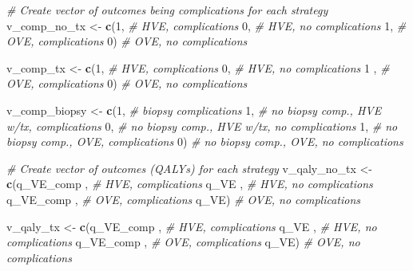 \documentclass[
]{article}
\newenvironment{Shaded}{\begin{snugshade}}{\end{snugshade}}
\newcommand{\CommentTok}[1]{\textcolor[rgb]{0.56,0.35,0.01}{\textit{#1}}}
\newcommand{\DecValTok}[1]{\textcolor[rgb]{0.00,0.00,0.81}{#1}}
\newcommand{\FunctionTok}[1]{\textcolor[rgb]{0.13,0.29,0.53}{\textbf{#1}}}
\newcommand{\NormalTok}[1]{#1}
\newcommand{\OtherTok}[1]{\textcolor[rgb]{0.56,0.35,0.01}{#1}}
\begin{document}
\begin{Shaded}
\begin{Highlighting}[]
\CommentTok{\# Create vector of outcomes being complications for each strategy }
\NormalTok{v\_comp\_no\_tx  }\OtherTok{\textless{}{-}} \FunctionTok{c}\NormalTok{(}\DecValTok{1}\NormalTok{,          }\CommentTok{\# HVE, complications}
                   \DecValTok{0}\NormalTok{,          }\CommentTok{\# HVE, no complications}
                   \DecValTok{1}\NormalTok{,          }\CommentTok{\# OVE, complications}
                   \DecValTok{0}\NormalTok{)          }\CommentTok{\# OVE, no complications}
  
\NormalTok{v\_comp\_tx     }\OtherTok{\textless{}{-}} \FunctionTok{c}\NormalTok{(}\DecValTok{1}\NormalTok{,          }\CommentTok{\# HVE, complications}
                   \DecValTok{0}\NormalTok{,          }\CommentTok{\# HVE, no complications}
                   \DecValTok{1}\NormalTok{ ,         }\CommentTok{\# OVE, complications}
                   \DecValTok{0}\NormalTok{)          }\CommentTok{\# OVE, no complications}
  
\NormalTok{v\_comp\_biopsy }\OtherTok{\textless{}{-}} \FunctionTok{c}\NormalTok{(}\DecValTok{1}\NormalTok{,          }\CommentTok{\# biopsy complications}
                   \DecValTok{1}\NormalTok{,          }\CommentTok{\# no biopsy comp., HVE w/tx, complications }
                   \DecValTok{0}\NormalTok{,          }\CommentTok{\# no biopsy comp., HVE w/tx, no complications}
                   \DecValTok{1}\NormalTok{,          }\CommentTok{\# no biopsy comp., OVE, complications}
                   \DecValTok{0}\NormalTok{)          }\CommentTok{\# no biopsy comp., OVE, no complications}
  

\CommentTok{\# Create vector of outcomes (QALYs) for each strategy }
\NormalTok{v\_qaly\_no\_tx  }\OtherTok{\textless{}{-}} \FunctionTok{c}\NormalTok{(q\_VE\_comp ,          }\CommentTok{\# HVE, complications}
\NormalTok{                   q\_VE      ,          }\CommentTok{\# HVE, no complications}
\NormalTok{                   q\_VE\_comp ,          }\CommentTok{\# OVE, complications}
\NormalTok{                   q\_VE)                }\CommentTok{\# OVE, no complications}
  
\NormalTok{v\_qaly\_tx     }\OtherTok{\textless{}{-}} \FunctionTok{c}\NormalTok{(q\_VE\_comp ,          }\CommentTok{\# HVE, complications}
\NormalTok{                   q\_VE      ,          }\CommentTok{\# HVE, no complications}
\NormalTok{                   q\_VE\_comp ,          }\CommentTok{\# OVE, complications}
\NormalTok{                   q\_VE)                }\CommentTok{\# OVE, no complications}


\end{Highlighting}
\end{Shaded}
\end{document}

